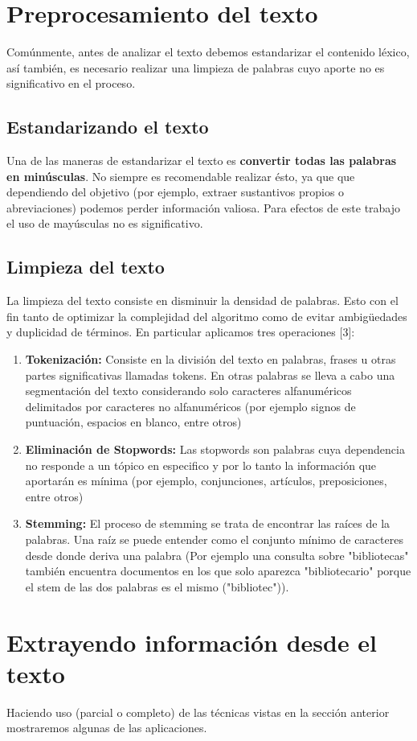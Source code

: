 \documentclass[conference]{IEEEtran}
\begin{document}
\section{Preprocesamiento del texto}
Comúnmente, antes de analizar el texto debemos estandarizar el contenido léxico, así también, es necesario realizar una limpieza de palabras cuyo aporte no es significativo en el proceso.
\subsection{Estandarizando el texto}
Una de las maneras de estandarizar el texto es \textbf{convertir todas las palabras en minúsculas}. No siempre es recomendable realizar ésto, ya que que dependiendo del objetivo (por ejemplo, extraer sustantivos propios o abreviaciones) podemos perder información valiosa. Para efectos de este trabajo el uso de mayúsculas no es significativo.
\subsection{Limpieza del texto}
La limpieza del texto consiste en disminuir la densidad de palabras. Esto con el fin tanto de optimizar la complejidad del algoritmo como de evitar ambigüedades y duplicidad de términos. En particular aplicamos tres operaciones [3]:
\begin{enumerate}
\item \textbf{Tokenización:} Consiste en la división del texto en palabras, frases u otras partes significativas llamadas tokens. En otras palabras se lleva a cabo una segmentación del texto considerando solo caracteres alfanuméricos delimitados por caracteres no alfanuméricos (por ejemplo signos de puntuación, espacios en blanco, entre otros)
\item \textbf{Eliminación de Stopwords:} Las stopwords son palabras cuya dependencia no responde a un tópico en especifico y por lo tanto la información que aportarán es mínima (por ejemplo, conjunciones, artículos, preposiciones, entre otros) 
\item \textbf{Stemming:} El proceso de stemming se trata de encontrar las raíces de la palabras. Una raíz se puede entender como el conjunto mínimo de caracteres desde donde deriva una palabra (Por ejemplo una consulta sobre "bibliotecas" también encuentra documentos en los que solo aparezca "bibliotecario" porque el stem de las dos palabras es el mismo ("bibliotec")).
\end{enumerate}

\section{Extrayendo información desde el texto}
Haciendo uso (parcial o completo) de las técnicas vistas en la sección anterior mostraremos algunas de las aplicaciones.
\end{document}
